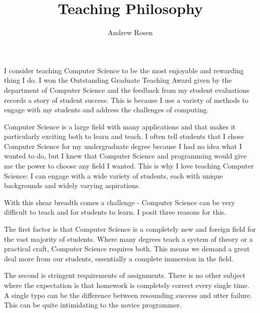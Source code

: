 \documentclass[12pt,a4paper]{article}
\author{Andrew Rosen}
\title{Teaching Philosophy}
\date{}
\begin{document}
\maketitle


I consider teaching Computer Science to be the most enjoyable and rewarding thing I do.
I won the Outstanding Graduate Teaching Award given by the department of Computer Science and the feedback from my  student evaluations records a story of student success. 
This is because I use a variety of methods to engage with my students and address the challenges of computing.



% 


Computer Science is a large field with many applications and that makes it particularly exciting both to learn and teach.
I often tell students that I chose Computer Science for my undergraduate degree because I had no idea what I wanted to do, but I knew that Computer Science and programming would give me the power to choose any field I wanted.
This is why I love teaching Computer Science:  I can engage with a wide variety of students, each with unique backgrounds and widely varying aspirations.

With this shear breadth comes a challenge - Computer Science can be very difficult to teach and for students to learn.
I posit three reasons for this.

The first factor is that Computer Science is a completely new and foreign field for the vast majority of students.
Where many degrees teach a system of theory or a practical craft, Computer Science requires both. 
This means we demand a great deal more from our students, essentially a complete immersion in the field.

The second is stringent requirements of assignments.
There is no other subject where the expectation is that homework is completely correct every single time.
A single typo can be the difference between resounding success and utter failure.
This can be quite intimidating to the novice programmer.
\end{document}

